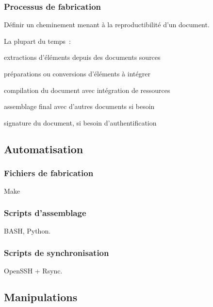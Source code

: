 \subsubsection{Processus de fabrication}

Définir un cheminement menant à la reproductibilité d’un document.

La plupart du temps :
\begin{itmz}
\item{extractions d’éléments depuis des documents sources}
\item{préparations ou conversions d’éléments à intégrer}
\item{compilation du document avec intégration de ressources}
\item{assemblage final avec d’autres documents si besoin}
\item{signature du document, si besoin d’authentification}
\end{itmz}

\hr

\subsection{Automatisation}

\subsubsection{Fichiers de fabrication}

Make

\subsubsection{Scripts d’assemblage}

BASH, Python.

\subsubsection{Scripts de synchronisation}

OpenSSH + Rsync.

\hr

\subsection{Manipulations}

